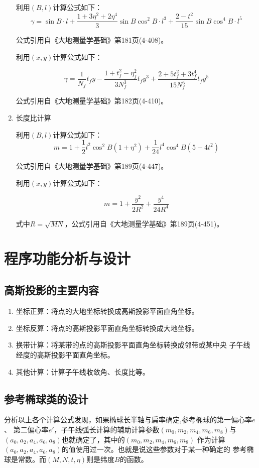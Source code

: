 \begin{enumerate}
利用$(B, l)$计算公式如下：
$$\gamma = \sin B \cdot l + \frac{1 + 3 \eta^2 + 2 \eta^4}{3} \sin B \cos ^2 B \cdot l^3
+ \frac{2 - t^2}{15}\sin B \cos ^4 B \cdot l^5$$

公式引用自《大地测量学基础》第181页(4-408)。

利用$(x, y)$计算公式如下：

$$\gamma = \frac{1}{N_f}t_f y - \frac{1+t_f ^2 - \eta_f ^2}{3N_f ^3}t_f y^3
+ \frac{2+5t_f^2+3t_f^4}{15N_f ^5}t_fy^5$$

公式引用自《大地测量学基础》第182页(4-410)。

\item 长度比计算

利用$(B, l)$计算公式如下：
$$m=1+\frac{1}{2}l^2 \cos ^2 B(1+\eta^2) + \frac{1}{24}l^4\cos ^4 B(5-4t^2)$$

公式引用自《大地测量学基础》第189页(4-447)。

利用$(x, y)$计算公式如下：

$$m=1+\frac{y^2}{2R^2} + \frac{y^4}{24R^4}$$

式中$R=\sqrt{MN}$，公式引用自《大地测量学基础》第189页(4-451)。

\end{enumerate}

\section{程序功能分析与设计}

\subsection{高斯投影的主要内容}
\begin{enumerate}
    \item 坐标正算：将点的大地坐标转换成高斯投影平面直角坐标。
    \item 坐标反算：将点的高斯投影平面直角坐标转换成大地坐标。
    \item 换带计算：将某带的点的高斯投影平面直角坐标转换成邻带或某中央
    子午线经度的高斯投影平面直角坐标。
    \item 其他计算：计算子午线收敛角、长度比等。
\end{enumerate}

\subsection{参考椭球类的设计}

分析以上各个计算公式发现，如果椭球长半轴与扁率确定,参考椭球的第一偏心率$e$、
第二偏心率$e'$，子午线弧长计算的辅助计算参数$(m_0, m_2, m_4, m_6, m_8)$与
$(a_0, a_2, a_4, a_6, a_8)$也就确定了，其中的$(m_0, m_2, m_4, m_6, m_8)$
作为计算$(a_0, a_2, a_4, a_6, a_8)$的值使用过一次。也就是说这些参数对于某一种确定的
参考椭球是常数。而$(M,N,t,\eta)$则是纬度$B$的函数。

